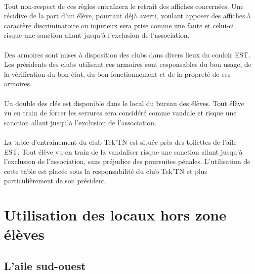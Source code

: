 \documentclass{article} %
\begin{document}
                \paragraph{}
				Tout non-respect de ces règles entraînera le retrait des
				affiches concernées. Une récidive de la part d’un élève,
				pourtant déjà averti, voulant apposer des affiches à caractère
				discriminatoire ou injurieux sera prise comme une faute et
				celui-ci risque une sanction allant jusqu’à l’exclusion de
				l’association.

                \paragraph{}
				Des armoires sont mises à disposition des clubs dans divers
				lieux du couloir EST\@. Les présidents des clubs utilisant ces
				armoires sont responsables du bon usage, de la vérification du
				bon état, du bon fonctionnement et de la propreté de ces
				armoires. 

                \paragraph{}
				Un double des clés est disponible dans le local du bureau des
				élèves. Tout élève vu en train de forcer les serrures sera
				considéré comme vandale et risque une sanction allant jusqu’à
				l’exclusion de l’association.

                \paragraph{}
				La table d'entraînement du club Tek’TN est située près des
				toilettes de l’aile EST\@. Tout élève vu en train de la
				vandaliser risque une sanction allant jusqu’à l’exclusion de
				l’association, sans préjudice des poursuites pénales.
				L’utilisation de cette table est placée sous la responsabilité
				du club Tek’TN et plus particulièrement de son président.

	\section{Utilisation des locaux hors zone élèves}
\label{sec:utilisation_des_locaux_hors_zone_eleves}

		\subsection{L'aile sud-ouest}
\label{sub:l_aile_sud_ouest}
\end{document}
